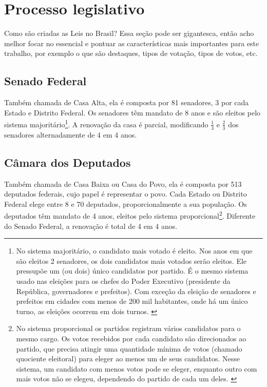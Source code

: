 \documentclass[a4paper,titlepage]{ppgi}\usepackage[]{graphicx}\usepackage[]{color}
\begin{document}
\section{Processo legislativo}

Como são criadas as Leis no Brasil? Essa seção pode ser gigantesca, então acho melhor focar no essencial e pontuar as características mais importantes para este trabalho, por exemplo o que são destaques, tipos de votação, tipos de votos, etc.

%

\subsection{Senado Federal}

Também chamada de Casa Alta, ela é composta por 81 senadores, 3 por cada Estado e Distrito Federal. Os senadores têm mandato de 8 anos e são eleitos pelo sistema majoritário\footnote{No sistema majoritário, o candidato mais votado é eleito. Nos anos em que são eleitos 2 senadores, os dois candidatos mais votados serão eleitos. Ele pressupõe um (ou dois) único candidatos por partido. É o mesmo sistema usado nas eleições para os chefes do Poder Executivo (presidente da República, governadores e prefeitos). Com exceção da eleição de senadores e prefeitos em cidades com menos de 200 mil habitantes, onde há um único turno, as eleições ocorrem em dois turnos. \cite{Netto2013}}. A renovação da casa é parcial, modificando $\frac{1}{3}$ e $\frac{2}{3}$ dos senadores alternadamente de 4 em 4 anos.

\subsection{Câmara dos Deputados}

Também chamada de Casa Baixa ou Casa do Povo, ela é composta por 513 deputados federais, cujo papel é representar o povo. Cada Estado ou Distrito Federal elege entre 8 e 70 deputados, proporcionalmente a sua população. Os deputados têm mandato de 4 anos, eleitos pelo sistema proporcional\footnote{No sistema proporcional os partidos registram vários candidatos para o mesmo cargo. Os votos recebidos por cada candidato são direcionados ao partido, que precisa atingir uma quantidade mínima de votos (chamado quociente eleitoral) para eleger ao menos um de seus candidatos. Nesse sistema, um candidato com menos votos pode se eleger, enquanto outro com mais votos não se elegeu, dependendo do partido de cada um deles. \cite{Netto2013,Bramatti2014}}. Diferente do Senado Federal, a renovação é total de 4 em 4 anos.
\end{document}
